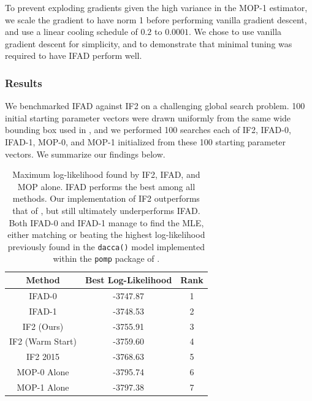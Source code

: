 \documentclass{article}
\begin{document}
To prevent exploding gradients given the high variance in the MOP-1 estimator, we scale the gradient to have norm 1 before performing vanilla gradient descent, and use a linear cooling schedule of $0.2$ to $ 0.0001$. We chose to use vanilla gradient descent for simplicity, and to demonstrate that minimal tuning was required to have IFAD perform well. 



\subsubsection{Results} 
We benchmarked IFAD against IF2 on a challenging global search problem. 100 initial starting parameter vectors were drawn uniformly from the same wide bounding box used in \cite{ionides15}, and we performed 100 searches each of IF2, IFAD-0, IFAD-1, MOP-0, and MOP-1 initialized from these 100 starting parameter vectors. We summarize our findings below. 

\begin{table}[h!]
\centering
\begin{tabular}{||c c c||} 
 \hline
 Method & Best Log-Likelihood & Rank \\ [0.5ex] 
 \hline\hline
     IFAD-0 & -3747.87 & 1\\
     IFAD-1 & -3748.53 & 2\\
     IF2 (Ours) & -3755.91 & 3\\
     IF2 (Warm Start) & -3759.60 & 4 \\
     IF2 2015 & -3768.63 & 5\\ 
     MOP-0 Alone & -3795.74 & 6\\
     MOP-1 Alone & -3797.38 & 7\\
 \hline
\end{tabular}
\caption{Maximum log-likelihood found by IF2, IFAD, and MOP alone. IFAD performs the best among all methods. Our implementation of IF2 outperforms that of \cite{ionides15}, but still ultimately underperforms IFAD. Both IFAD-0 and IFAD-1 manage to find the MLE, either matching or beating the highest log-likelihood previously found in the \texttt{dacca()} model implemented within the \texttt{pomp} package of \cite{king16}.}
\label{table:mle}
\end{table}
\end{document}
